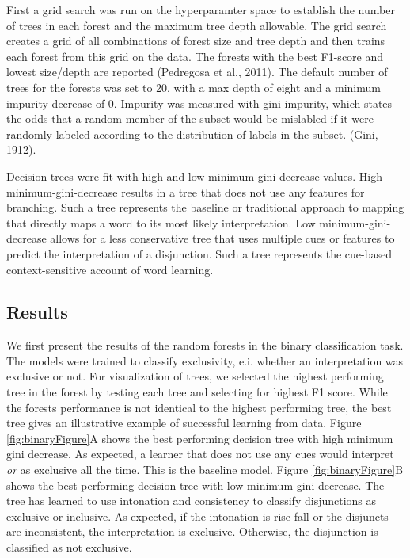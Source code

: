 \documentclass[,man,floatsintext]{apa6}
\begin{document}
First a grid search was run on the hyperparamter space to establish the number of trees in each forest and the maximum tree depth allowable. The grid search creates a grid of all combinations of forest size and tree depth and then trains each forest from this grid on the data. The forests with the best F1-score and lowest size/depth are reported (Pedregosa et al., 2011). The default number of trees for the forests was set to 20, with a max depth of eight and a minimum impurity decrease of 0. Impurity was measured with gini impurity, which states the odds that a random member of the subset would be mislabled if it were randomly labeled according to the distribution of labels in the subset. (Gini, 1912).

Decision trees were fit with high and low minimum-gini-decrease values. High minimum-gini-decrease results in a tree that does not use any features for branching. Such a tree represents the baseline or traditional approach to mapping that directly maps a word to its most likely interpretation. Low minimum-gini-decrease allows for a less conservative tree that uses multiple cues or features to predict the interpretation of a disjunction. Such a tree represents the cue-based context-sensitive account of word learning.

\hypertarget{results-1}{%
\subsection{Results}\label{results-1}}

We first present the results of the random forests in the binary classification task. The models were trained to classify exclusivity, e.i. whether an interpretation was exclusive or not. For visualization of trees, we selected the highest performing tree in the forest by testing each tree and selecting for highest F1 score. While the forests performance is not identical to the highest performing tree, the best tree gives an illustrative example of successful learning from data. Figure \ref{fig:binaryFigure}A shows the best performing decision tree with high minimum gini decrease. As expected, a learner that does not use any cues would interpret \emph{or} as exclusive all the time. This is the baseline model. Figure \ref{fig:binaryFigure}B shows the best performing decision tree with low minimum gini decrease. The tree has learned to use intonation and consistency to classify disjunctions as exclusive or inclusive. As expected, if the intonation is rise-fall or the disjuncts are inconsistent, the interpretation is exclusive. Otherwise, the disjunction is classified as not exclusive.
\end{document}
